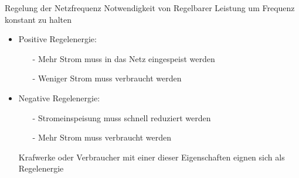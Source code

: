 \documentclass[aspectratio=1610, professionalfonts, 9pt]{beamer}
\begin{document}
\begin{frame}{Regelung der Netzfrequenz}
Notwendigkeit von Regelbarer Leistung um Frequenz konstant zu halten
\begin{itemize}
  \item Positive Regelenergie:
  \begin{itemize}
    \item[-] Mehr Strom muss in das Netz eingespeist werden
    \item[-] Weniger Strom muss verbraucht werden
  \end{itemize}
  \item Negative Regelenergie:
  \begin{itemize}
    \item[-] Stromeinspeisung muss schnell reduziert werden
    \item[-] Mehr Strom muss verbraucht werden
  \end{itemize}
  \item[\rightarrow] Krafwerke oder Verbraucher mit einer dieser Eigenschaften eignen sich als Regelenergie
\end{itemize}
\end{frame}
\end{document}
